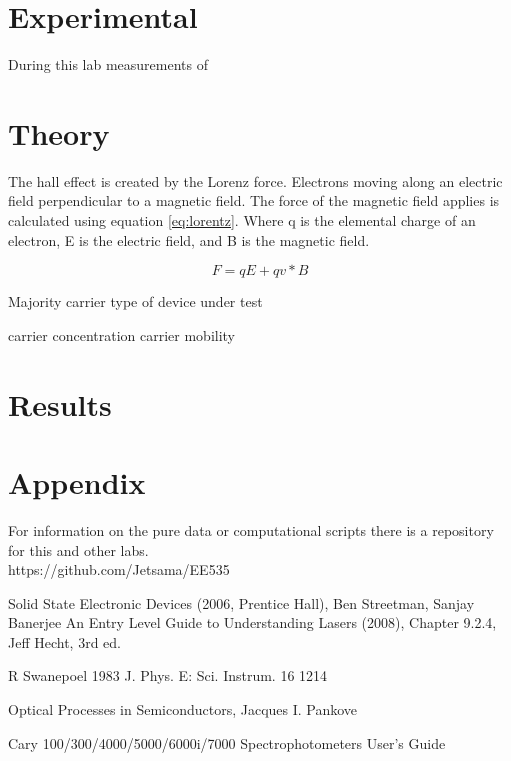 \documentclass[10pt,a4paper]{article}
\begin{document}
\begin{multicols}{2}
\section*{Experimental}
During this lab measurements of 





\section*{Theory}
The hall effect is created by the Lorenz force. Electrons moving along an electric field perpendicular to a magnetic field. The force of the magnetic field applies is calculated using equation \ref{eq:lorentz}. Where q is the elemental charge of an electron, E is the electric field, and B is the magnetic field.


\begin{equation}\label{eq:lorentz}
F = qE + qv*B
\end{equation}


Majority carrier type of device under test

carrier concentration
carrier mobility








\section*{Results}


\section*{Appendix}
For information on the pure data or computational scripts there is a repository for this and other labs. \\
https://github.com/Jetsama/EE535\\
\begin{thebibliography}{9}
 Solid State Electronic Devices (2006, Prentice Hall), Ben Streetman, Sanjay Banerjee
An Entry Level Guide to Understanding Lasers (2008), Chapter 9.2.4, Jeff Hecht, 3rd ed. 

R Swanepoel 1983 J. Phys. E: Sci. Instrum. 16 1214

Optical Processes in Semiconductors, Jacques I. Pankove

Cary 100/300/4000/5000/6000i/7000 Spectrophotometers User's Guide


\end{thebibliography}
\end{multicols}
\end{document}
